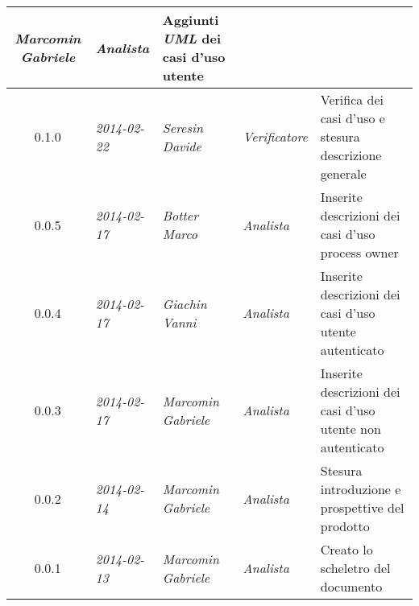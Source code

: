 \begin{small}
\begin{tabular}{|c|p{1.8cm}|p{2.8cm}|p{2.8cm}|p{3.5cm}|}
\textit{Marcomin Gabriele} &
\textit{Analista} &  Aggiunti \textit{UML} dei casi d'uso utente\\
\hline
0.1.0 & \textit{2014-02-22} &
\textit{Seresin Davide} &
\textit{Verificatore} &  Verifica dei casi d'uso e stesura descrizione generale\\
\hline
0.0.5 & \textit{2014-02-17} &
\textit{Botter Marco} &
\textit{Analista} &  Inserite descrizioni dei casi d'uso process owner\\
\hline
0.0.4 & \textit{2014-02-17} &
\textit{Giachin Vanni} &
\textit{Analista} &  Inserite descrizioni dei casi d'uso utente autenticato\\
\hline
0.0.3 & \textit{2014-02-17} &
\textit{Marcomin Gabriele} &
\textit{Analista} &  Inserite descrizioni dei casi d'uso utente non autenticato\\
\hline
0.0.2 & \textit{2014-02-14} & 
\textit{Marcomin Gabriele} &
\textit{Analista} &  Stesura introduzione e prospettive del prodotto\\
\hline
0.0.1 & \textit{2014-02-13} &
\textit{Marcomin Gabriele} &
\textit{Analista} &  Creato lo scheletro del documento\\
\hline
\end{tabular}
\end{small}